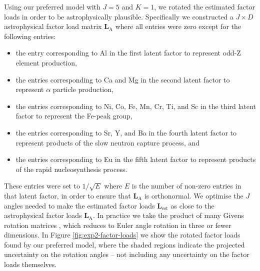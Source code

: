 \documentclass[twocolumn]{aastex62}
\newcommand{\factorloads}{\textbf{L}}
\begin{document}
Using our preferred model with $J = 5$ and $K = 1$, we rotated the estimated
factor loads in order to be astrophysically plausible. Specifically we constructed
a $J \times D$ astrophysical factor load matrix $\factorloads_\textrm{A}$ where
all entries were zero except for the following entries:
\begin{itemize}
	\item the entry corresponding to Al in the first latent factor to represent
		  odd-Z element production,
	\item the entries corresponding to Ca and Mg in the second latent factor to
		  represent $\alpha$ particle production,
	\item the entries corresponding to Ni, Co, Fe, Mn, Cr, Ti, and Sc in the third
		  latent factor to represent the Fe-peak group,
	\item the entries corresponding to Sr, Y, and Ba in the fourth latent factor
		  to represent products of the slow neutron capture process, and
	\item the entries corresponding to Eu in the fifth latent factor to represent
		  products of the rapid nucleosynthesis process.
\end{itemize}
These entries were set to $1/\sqrt{E}$ where $E$ is the number of non-zero entries
in that latent factor, in order to ensure that $\factorloads_\textrm{A}$ is
orthonormal. We optimise the $J$ angles needed to make the estimated factor loads
$\factorloads_\textrm{est}$ as close to the astrophysical factor loads $\factorloads_\textrm{A}$.
In practice we take the product of many  Givens rotation matrices \citep{Givens},
which reduces to Euler angle rotation in three or fewer dimensions.
In Figure
\ref{fig:exp2-factor-loads} we show the rotated factor loads found by our
preferred model, where the shaded regions indicate the projected uncertainty on
the rotation angles -- not including any uncertainty on the factor loads themselves.
\end{document}
